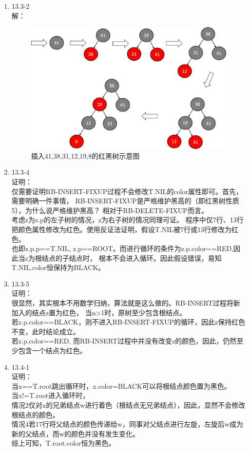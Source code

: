 \documentclass[UTF8]{ctexart}
\begin{document}
\begin{enumerate}
	\item 13.3-2 \\
	解：\\
		\begin{figure}[H]
		\centering
        \caption{插入41,38,31,12,19,8的红黑树示意图}
		\includegraphics[scale=0.65]{13_3_2.png}
		\end{figure}
		
	\item 13.3-4 \\
	证明：\\
		仅需要证明RB-INSERT-FIXUP过程不会修改T.NIL的color属性即可。首先，需要明确一件事情，
		RB-INSERT-FIXUP是严格维护黑高的（即红黑树性质5），为什么说严格维护黑高？
		相对于RB-DELETE-FIXUP而言。\\
		考虑z为z.p的左子树的情况，z为右子树的情况同理可证。
		程序中仅7行、13行把颜色属性修改为红色。使用反证法证明，假设T.NIL被7行或13行修改为红色。\\
		也即z.p.p==T.NIL, z.p==ROOT。而进行循环的条件为z.p.color==RED,因此当z为根结点的子结点时，
		根本不会进入循环。因此假设错误，易知T.NIL.color恒保持为BLACK。
	
	\item 13.3-5 \\
	证明：\\
		很显然，其实根本不用数学归纳，算法就是这么做的。RB-INSERT过程将新加入的结点z置为红色，
		当n>1时，原树至少包含根结点。\\
		若z.p.color==BLACK，则不进入RB-INSERT-FIXUP的循环，因此z保持红色不变，此时结论成立。\\
		若z.p.color==RED, 而RB-INSERT过程中并没有改变z的颜色，因此，仍然至少包含一个结点为红色。
	
	\item 13.4-1 \\
	证明：\\
		当x==T.root跳出循环时，x.color=BLACK可以将根结点颜色置为黑色。\\
		当x!=T.root进入循环时，\\
		情况2仅对x的兄弟结点w进行着色（根结点无兄弟结点），因此，显然不会修改根结点的颜色。\\
		情况4若17行将父结点的颜色传递给w，同事对父结点进行左旋，左旋后w成为新的父结点，而w的颜色并没有发生变化。\\
		综上可知，T.root.color恒为黑色。
	

\end{enumerate}
\end{document}

